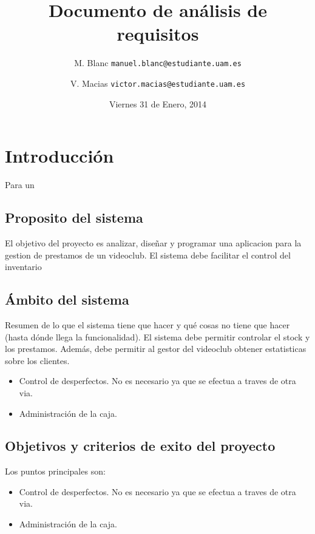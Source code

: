 \documentclass[11pt]{article}
\title{Documento de análisis de requisitos}
\author{M. Blanc \texttt{manuel.blanc@estudiante.uam.es} \and V. Macias \texttt{victor.macias@estudiante.uam.es}}
\date{Viernes 31 de Enero, 2014}
\begin{document}
\clearpage\maketitle
\thispagestyle{empty}
\tableofcontents

\section{Introducción}
Para un
\subsection{Proposito del sistema}
El objetivo del proyecto es analizar, diseñar y programar una aplicacion para la gestion de prestamos de un videoclub. El sistema debe facilitar el control del inventario

\subsection{Ámbito del sistema}
Resumen de lo que el sistema tiene que hacer y qué cosas no tiene que hacer (hasta dónde llega la funcionalidad).
El sistema debe permitir controlar el stock y los prestamos. Además, debe permitir al gestor del videoclub obtener estatisticas sobre los clientes.

\begin{itemize}
	\item Control de desperfectos. No es necesario ya que se efectua a traves de otra via.
	\item Administración de la caja.
\end{itemize}

\subsection{Objetivos y criterios de exito del proyecto}
Los puntos principales son:
\begin{itemize}
	\item Control de desperfectos. No es necesario ya que se efectua a traves de otra via.
	\item Administración de la caja.
\end{itemize}
\end{document}
